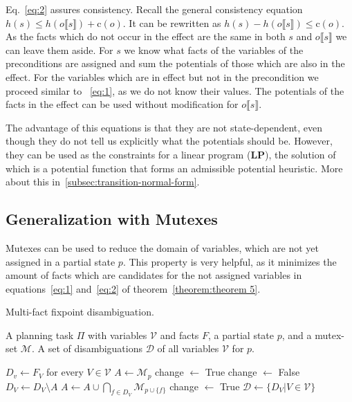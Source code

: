 Eq.~\eqref{eq:2} assures consistency.
Recall the general consistency equation $h(s)\leq h(o\llbracket s\rrbracket)+\text{c}(o)$.
It can be rewritten as $h(s)-h(o\llbracket s\rrbracket)\leq\text{c}(o)$.
As the facts which do not occur in the effect are the same in both $s$ and $o\llbracket s\rrbracket$ we can leave them aside. %
For $s$ we know what facts of the variables of the preconditions are assigned and sum the potentials of those which are also in the effect.
For the variables which are in effect but not in the precondition we proceed similar to ~\eqref{eq:1}, as we do not know their values.
The potentials of the facts in the effect can be used without modification for  $o\llbracket s\rrbracket$.

The advantage of this equations is that they are not state-dependent, even though they do not tell us explicitly what the potentials should be.
However, they can be used as the constraints for a linear program (\textbf{LP}), the solution of which is a potential function that forms an admissible potential heuristic.
More about this in~\ref{subsec:transition-normal-form}.

\subsection{Generalization with Mutexes}\label{subsec:pot-generalize-with-mutexes}
Mutexes can be used to reduce the domain of variables, which are not yet assigned in a partial state $p$.
This property is very helpful, as it minimizes the amount of facts which are candidates for the not assigned variables in equations~\eqref{eq:1} and~\eqref{eq:2} of theorem~\ref{theorem:theorem 5}.

\begin{algorithm}[H]
    \caption{Multi-fact fixpoint disambiguation.}
    \label{alg:multi-fact}
    \begin{algorithmic}[1] %
        \Require A planning task $\Pi$ with variables $\mathcal{V}$ and facts $F$, a partial state $p$, and a mutex-set $\mathcal{M}$.
        \Ensure A set of disambiguations $\mathcal{D}$ of all variables $\mathcal{V}$ for $p$.

        \State $D_v\leftarrow F_V$ for every $V\in\mathcal{V}$\;
        \State $A\leftarrow \mathcal{M}_p$\;
        \State change $\leftarrow$ True\;
        \State change $\leftarrow$ False\;
        \State $D_V\leftarrow D_V\setminus A$\;
        \State $A\leftarrow A\cup \bigcap_{f\in D_V}\mathcal{M}_{p\cup \{f\}} $\; \label{lst:line:A}
        \State change $\leftarrow$ True\;
        \EndIf
        \EndFor
        \EndWhile
        \State $\mathcal{D}\leftarrow\{D_V|V\in\mathcal{V}\}$\;
    \end{algorithmic}
\end{algorithm}

